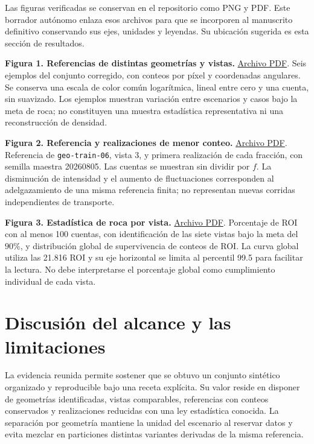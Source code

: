 \documentclass[11pt,a4paper]{article}
\begin{document}
Las figuras verificadas se conservan en el repositorio como PNG y PDF. Este borrador autónomo enlaza esos archivos para que se incorporen al manuscrito definitivo conservando sus ejes, unidades y leyendas. Su ubicación sugerida es esta sección de resultados.

\noindent\textbf{Figura 1. Referencias de distintas geometrías y vistas.}
\href{https://github.com/anlegogo/muografia-documentada/blob/4529c49/objetivo-1/figuras/cierre-2026-10-03/01-referencias.pdf}{Archivo PDF}.
Seis ejemplos del conjunto corregido, con conteos por píxel y coordenadas angulares. Se conserva una escala de color común logarítmica, lineal entre cero y una cuenta, sin suavizado. Los ejemplos muestran variación entre escenarios y casos bajo la meta de roca; no constituyen una muestra estadística representativa ni una reconstrucción de densidad.

\noindent\textbf{Figura 2. Referencia y realizaciones de menor conteo.}
\href{https://github.com/anlegogo/muografia-documentada/blob/4529c49/objetivo-1/figuras/cierre-2026-10-03/02-pares.pdf}{Archivo PDF}.
Referencia de \texttt{geo-train-06}, vista 3, y primera realización de cada fracción, con semilla maestra 20260805. Las cuentas se muestran sin dividir por $f$. La disminución de intensidad y el aumento de fluctuaciones corresponden al adelgazamiento de una misma referencia finita; no representan nuevas corridas independientes de transporte.

\noindent\textbf{Figura 3. Estadística de roca por vista.}
\href{https://github.com/anlegogo/muografia-documentada/blob/4529c49/objetivo-1/figuras/cierre-2026-10-03/03-calidad-roca.pdf}{Archivo PDF}.
Porcentaje de ROI con al menos 100 cuentas, con identificación de las siete vistas bajo la meta del $90\%$, y distribución global de supervivencia de conteos de ROI. La curva global utiliza las 21.816 ROI y su eje horizontal se limita al percentil 99.5 para facilitar la lectura. No debe interpretarse el porcentaje global como cumplimiento individual de cada vista.

\section{Discusión del alcance y las limitaciones}

La evidencia reunida permite sostener que se obtuvo un conjunto sintético organizado y reproducible bajo una receta explícita. Su valor reside en disponer de geometrías identificadas, vistas comparables, referencias con conteos conservados y realizaciones reducidas con una ley estadística conocida. La separación por geometría mantiene la unidad del escenario al reservar datos y evita mezclar en particiones distintas variantes derivadas de la misma referencia.
\end{document}
